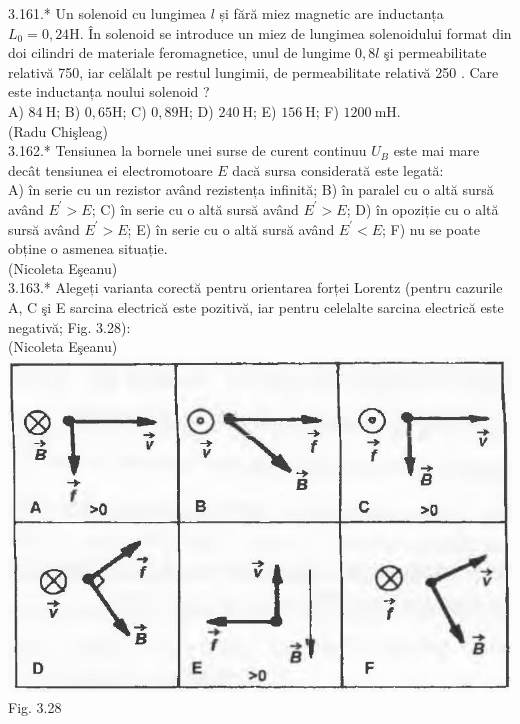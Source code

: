 \documentclass[10pt]{article}
\begin{document}
3.161.* Un solenoid cu lungimea $l$ și fără miez magnetic are inductanța $L_{0}=0,24 \mathrm{H}$. În solenoid se introduce un miez de lungimea solenoidului format din doi cilindri de materiale feromagnetice, unul de lungime $0,8 l$ şi permeabilitate relativă 750, iar celălalt pe restul lungimii, de permeabilitate relativă 250 . Care este inductanța noului solenoid ?\\ A) $84 \mathrm{~H}$; B) $0,65 \mathrm{H}$; C) $0,89 \mathrm{H}$; D) $240 \mathrm{~H}$; E) $156 \mathrm{~H}$; F) $1200 \mathrm{~mH}$.\\ (Radu Chişleag)\\

3.162.* Tensiunea la bornele unei surse de curent continuu $U_{B}$ este mai mare decât tensiunea ei electromotoare $E$ dacă sursa considerată este legată:\\ A) în serie cu un rezistor având rezistența infinită; B) în paralel cu o altă sursă având $E^{\prime}>E$; C) în serie cu o altă sursă având $E^{\prime}>E$; D) în opoziție cu o altă sursă având $E^{\prime}>E$; E) în serie cu o altă sursă având $E^{\prime}<E$; F) nu se poate obține o asmenea situație.\\ (Nicoleta Eşeanu)\\

3.163.* Alegeți varianta corectă pentru orientarea forței Lorentz (pentru cazurile A, C şi E sarcina electrică este pozitivă, iar pentru celelalte sarcina electrică este negativă; Fig. 3.28):\\ (Nicoleta Eşeanu)\\ \includegraphics[max width=\textwidth, center]{2025_07_01_5b3ff9fa0d508c8e9f17g-180(1)} Fig. 3.28\\
\end{document}
